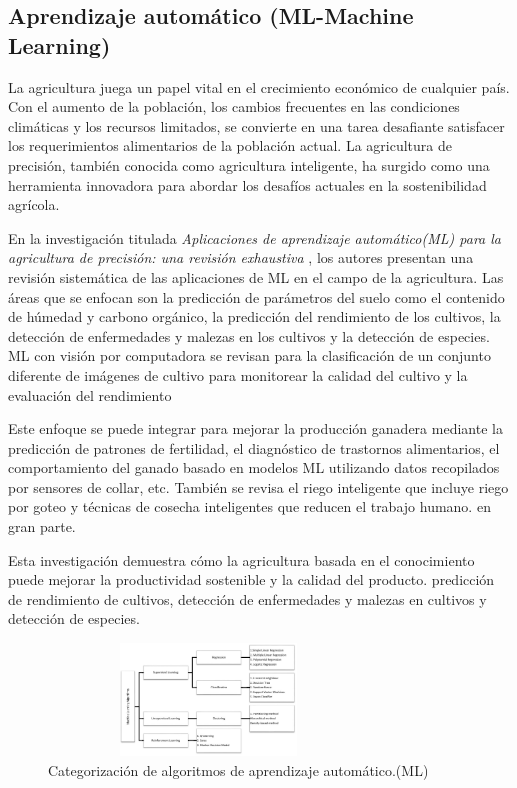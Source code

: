 \documentclass[10pt,journal]{IEEEtran}
\begin{document}
\subsection{\textbf{Aprendizaje automático (ML-Machine Learning)}}
La agricultura juega un papel vital en el crecimiento económico de cualquier país. Con el aumento de la población, los cambios frecuentes en las condiciones climáticas y los recursos limitados, se convierte en una tarea desafiante satisfacer los requerimientos alimentarios de la población actual. La agricultura de precisión, también conocida como agricultura inteligente, ha surgido como una herramienta innovadora para abordar los desafíos actuales en la sostenibilidad agrícola.\par
En la investigación titulada \textit{Aplicaciones de aprendizaje automático(ML) para la agricultura de precisión: una revisión exhaustiva} \citep{machine}, los autores presentan una revisión sistemática de las aplicaciones de ML en el campo de la agricultura. Las áreas que se enfocan son la predicción de parámetros del suelo como el contenido de húmedad y carbono orgánico, la predicción del rendimiento de los cultivos, la detección de enfermedades y malezas en los cultivos y la detección de especies. ML con visión por computadora se revisan para la clasificación de un conjunto diferente de imágenes de cultivo para monitorear la calidad del cultivo y la evaluación del rendimiento
\par Este enfoque se puede integrar para mejorar la producción ganadera mediante la predicción de patrones de fertilidad, el diagnóstico de trastornos alimentarios, el comportamiento del ganado basado en modelos ML utilizando datos recopilados por sensores de collar, etc. También se revisa el riego inteligente que incluye riego por goteo y técnicas de cosecha inteligentes que reducen el trabajo humano. en gran parte. \par Esta investigación demuestra cómo la agricultura basada en el conocimiento puede mejorar la productividad sostenible y la calidad del producto. predicción de rendimiento de cultivos, detección de enfermedades y malezas en cultivos y detección de especies.

\begin{figure}[H]
 \begin{center}
       \includegraphics[width=8.5cm, height=3cm]{figuras/3.JPG}
      \caption{Categorización de algoritmos de aprendizaje automático.(ML)}
      \label{f3} 
      \end{center}
\end{figure}
\end{document}
